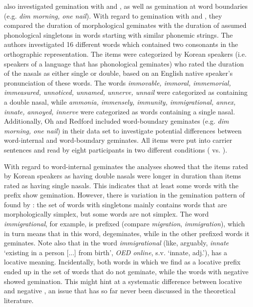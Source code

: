 \cite{Oh.2012} also investigated gemination with  and , as well as gemination at word boundaries  (e.g. \textit{dim morning, one nail}). With regard to gemination with  and , they compared the duration of  morphological geminates with the duration of assumed phonological singletons in words starting with similar phonemic strings. The authors investigated 16 different words which contained two consonants in the orthographic representation.  The items were categorized  by Korean speakers (i.e. speakers of a language that has phonological geminates) who rated the duration of the nasals as either single or double, based on an English native speaker’s pronunciation of these words. The words \textit{immovable, immoral, immemorial, immeasured, unnoticed, unnamed, unnerve, unnail} were categorized as containing a double nasal, while \textit{ammonia, immensely, immunity, immigrational, annex, innate, annoyed, innerve} were categorized as words containing a single nasal. 
Additionally, Oh and Redford included word-boundary geminates (e.g. \textit{dim morning, one nail}) in their data set to investigate potential differences between word-internal and word-boundary geminates. All items were put into carrier sentences and read by eight participants in two different conditions ( vs. ). 

With regard to word-internal geminates the analyses showed that the items rated by Korean speakers as having double nasals were longer in duration than items rated as having single nasals. This indicates that at least some words with the prefix  show gemination.
However, there is variation in the gemination pattern of  found by \cite{Oh.2012}: the set of words with singletons mainly contains words that are morphologically simplex, but some words are not simplex. The word \textit{immigrational}, for example, is prefixed (compare \textit{migration}, \textit{immigration}), which in turn means that in this word,  {degeminates}, while in the other prefixed words it geminates. Note also that  in the word \textit{immigrational} (like, arguably, \textit{innate} `existing in a person [...] from birth', \textit{OED online}\nocite{OED.2013}, s.v. `innate, adj.'), has a locative meaning. Incidentally, both words in which we find  as a locative prefix ended up in the set of words that do not geminate, while the words with negative  showed gemination. This might hint at a systematic difference between locative and negative , an issue that has so far never been discussed in the theoretical literature.


